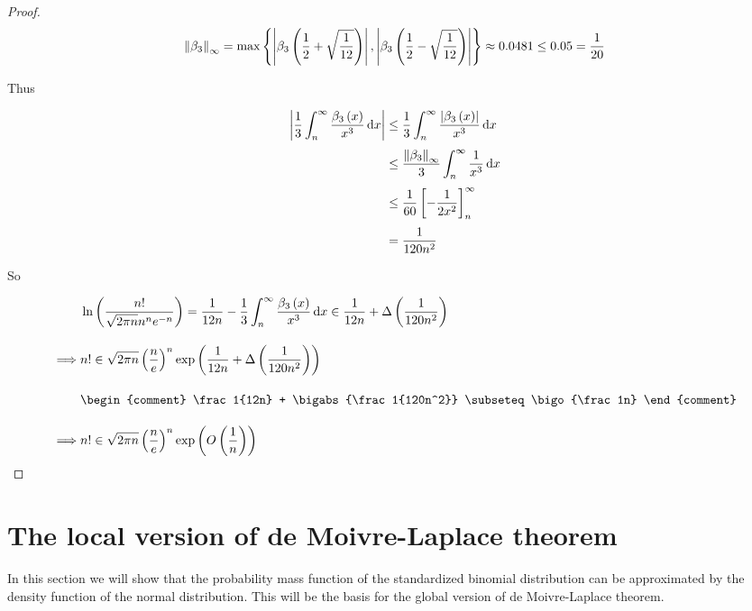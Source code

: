 \begin{proof}
  \begin{align}
    \snorm{\bps[3]} = \max\left\{\abs{\bp[3]{\frac 12 + \sqrt{\frac{1}{12}}}}, \abs{\bp[3]{\frac 12 - \sqrt{\frac{1}{12}}}}\right\} \approx 0.0481 \le 0.05 = \frac{1}{20}
  \end{align}

  \noindent Thus

  \begin{align}
    \abs{\frac 13\int_n^\infty \frac{\bp[3]{x}}{x^3} \d{x}} & \le \frac 13 \int_n^\infty \frac{\abs{\bp[3]{x}}}{x^3} \d{x} \nl
    & \le \frac{\snorm{\bps[3]}}{3} \int_n^\infty \frac 1{x^3} \d{x} \nl
    & \le \frac{1}{60} \left[-\frac{1}{2x^2}\right]_n^\infty \nl
    & = \frac 1{120n^2}
  \end{align}

  \noindent So

  \begin{align}
    & \ln\left(\frac{n!}{\sqrt{2\pi n}n^n e^{-n}}\right) = \frac 1{12n} - \frac 13 \int_n^\infty \frac{\bp[3]{x}}{x^3} \d{x} \in \frac 1{12n} + \bigabs{\frac{1}{120n^2}} \bnl
    \implies & n! \in \sqrt{2\pi n} \left(\frac ne\right)^n \fexp{\frac 1{12n} + \bigabs{\frac 1{120n^2}}} \bnl
    &
    \begin{comment}
      \frac 1{12n} + \bigabs{\frac 1{120n^2}} \subseteq \bigo{\frac 1n}
    \end{comment} \bnl
    \implies & n! \in \sqrt{2\pi n} \left(\frac ne\right)^n \fexp{\bigo{\frac 1n}}
  \end{align}
\end{proof}

\section{The local version of de Moivre-Laplace theorem}

In this section we will show that the probability mass function of the standardized binomial distribution can be approximated by the density function of the normal distribution. This will be the basis for the global version of de Moivre-Laplace theorem. 

\begin{theorem}
\end{theorem}

